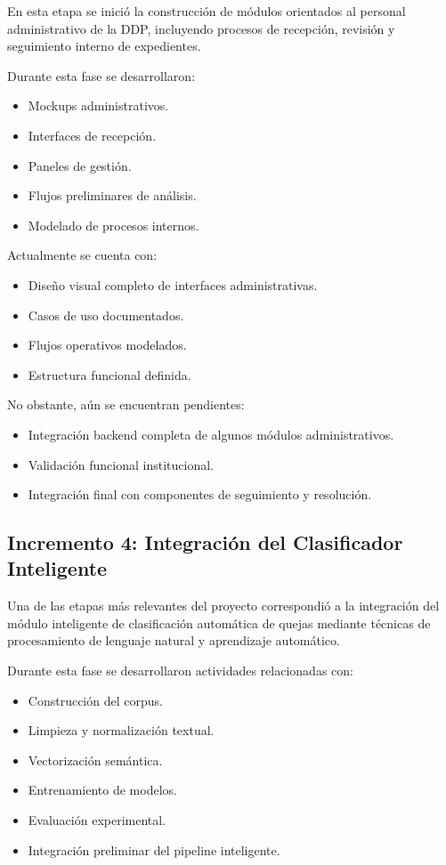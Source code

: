 En esta etapa se inició la construcción de módulos orientados al personal administrativo de la DDP, incluyendo procesos de recepción, revisión y seguimiento interno de expedientes.

Durante esta fase se desarrollaron:

\begin{itemize}
    \item Mockups administrativos.
    \item Interfaces de recepción.
    \item Paneles de gestión.
    \item Flujos preliminares de análisis.
    \item Modelado de procesos internos.
\end{itemize}

Actualmente se cuenta con:

\begin{itemize}
    \item Diseño visual completo de interfaces administrativas.
    \item Casos de uso documentados.
    \item Flujos operativos modelados.
    \item Estructura funcional definida.
\end{itemize}

No obstante, aún se encuentran pendientes:

\begin{itemize}
    \item Integración backend completa de algunos módulos administrativos.
    \item Validación funcional institucional.
    \item Integración final con componentes de seguimiento y resolución.
\end{itemize}

\subsection{Incremento 4: Integración del Clasificador Inteligente}

Una de las etapas más relevantes del proyecto correspondió a la integración del módulo inteligente de clasificación automática de quejas mediante técnicas de procesamiento de lenguaje natural y aprendizaje automático.

Durante esta fase se desarrollaron actividades relacionadas con:

\begin{itemize}
    \item Construcción del corpus.
    \item Limpieza y normalización textual.
    \item Vectorización semántica.
    \item Entrenamiento de modelos.
    \item Evaluación experimental.
    \item Integración preliminar del pipeline inteligente.
\end{itemize}

